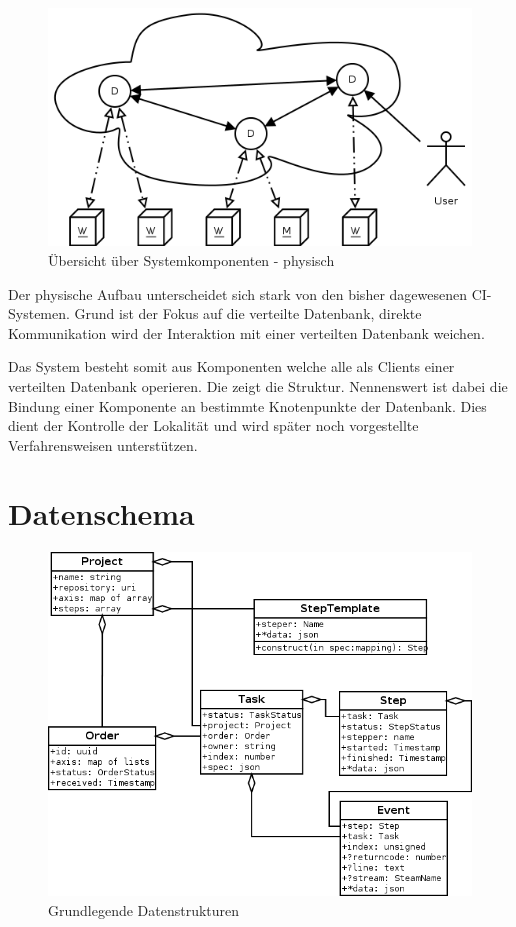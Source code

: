 \begin{figure}[ht] 
  \centering
  \includegraphics[width=\textwidth]{imageinput/grob-layout-komponenten.png}
  \caption{Übersicht über Systemkomponenten - physisch}
  \label{fig:grob-layout-komponenten}
\end{figure}

Der physische Aufbau unterscheidet sich stark von den bisher dagewesenen CI-Systemen.
Grund ist der Fokus auf die verteilte Datenbank, direkte Kommunikation
wird der Interaktion mit einer verteilten Datenbank weichen.

Das System besteht somit aus Komponenten welche alle als Clients einer verteilten Datenbank operieren.
Die  zeigt die Struktur.
Nennenswert ist dabei die Bindung einer Komponente an bestimmte Knotenpunkte der Datenbank. Dies dient der Kontrolle der Lokalität und wird später noch vorgestellte Verfahrensweisen unterstützen.


\section{Datenschema}


\begin{figure}[ht] 
  \centering
  \label{fig:datenstrukturen}
  \includegraphics[width=\textwidth]{imageinput/datenstrukturen-step-templates.png}
  \caption{Grundlegende Datenstrukturen}
\end{figure}

